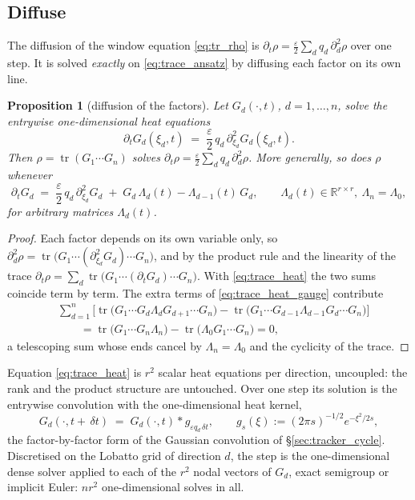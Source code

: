 \documentclass[11pt,a4paper]{article}
\newcommand{\R}{\mathbb{R}}
\newcommand{\tr}{\operatorname{tr}}
\newcommand{\eps}{\varepsilon}
\newcommand{\dt}{\,\delta t}
\theoremstyle{plain}
\newtheorem{proposition}{Proposition}
\theoremstyle{definition}
\theoremstyle{remark}
\begin{document}
\subsection{Diffuse}
\label{sec:trace_diffuse}

The diffusion of the window equation \eqref{eq:tr_rho} is $\partial_t\rho = \tfrac\eps2\sum_dq_d\,\partial_d^2\rho$ over one step. It is solved \emph{exactly} on \eqref{eq:trace_ansatz} by diffusing each factor on its own line.

\begin{proposition}[diffusion of the factors]
\label{prop:trace_diffuse}
Let $G_d(\cdot,t)$, $d=1,\dots,n$, solve the entrywise one-dimensional heat equations
\begin{equation}
  \partial_tG_d(\xi_d,t) \;=\; \frac\eps2\,q_d\,\partial_{\xi_d}^2G_d(\xi_d,t) .
  \label{eq:trace_heat}
\end{equation}
Then $\rho=\tr(G_1\cdots G_n)$ solves $\partial_t\rho = \tfrac\eps2\sum_dq_d\,\partial_d^2\rho$. More generally, so does $\rho$ whenever
\begin{equation}
  \partial_tG_d \;=\; \frac\eps2\,q_d\,\partial_{\xi_d}^2G_d \;+\; G_d\,\Lambda_d(t) - \Lambda_{d-1}(t)\,G_d, \qquad \Lambda_d(t)\in\R^{r\times r},\ \Lambda_n=\Lambda_0,
  \label{eq:trace_heat_gauge}
\end{equation}
for arbitrary matrices $\Lambda_d(t)$.
\end{proposition}
\begin{proof}
Each factor depends on its own variable only, so $\partial_d^2\rho = \tr\big(G_1\cdots(\partial_{\xi_d}^2G_d)\cdots G_n\big)$, and by the product rule and the linearity of the trace $\partial_t\rho = \sum_d\tr\big(G_1\cdots(\partial_tG_d)\cdots G_n\big)$. With \eqref{eq:trace_heat} the two sums coincide term by term. The extra terms of \eqref{eq:trace_heat_gauge} contribute
\begin{align*}
  &\sum_{d=1}^n\Big[\tr\big(G_1\cdots G_d\Lambda_dG_{d+1}\cdots G_n\big) - \tr\big(G_1\cdots G_{d-1}\Lambda_{d-1}G_d\cdots G_n\big)\Big] \\
  &\qquad= \tr\big(G_1\cdots G_n\Lambda_n\big) - \tr\big(\Lambda_0G_1\cdots G_n\big) = 0,
\end{align*}
a telescoping sum whose ends cancel by $\Lambda_n=\Lambda_0$ and the cyclicity of the trace.
\end{proof}

Equation \eqref{eq:trace_heat} is $r^2$ scalar heat equations per direction, uncoupled: the rank and the product structure are untouched. Over one step its solution is the entrywise convolution with the one-dimensional heat kernel,
\begin{equation}
  G_d(\cdot,t+\dt) \;=\; G_d(\cdot,t) * g_{\eps q_d\dt}, \qquad g_s(\xi) := (2\pi s)^{-1/2}e^{-\xi^2/2s},
  \label{eq:trace_conv}
\end{equation}
the factor-by-factor form of the Gaussian convolution of \S\ref{sec:tracker_cycle}. Discretised on the Lobatto grid of direction $d$, the step is the one-dimensional dense solver applied to each of the $r^2$ nodal vectors of $G_d$, exact semigroup or implicit Euler: $nr^2$ one-dimensional solves in all.
\end{document}

